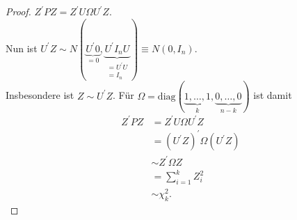 \documentclass{tstextbook}
\begin{document}
\begin{proof}
	$ Z^\prime PZ = Z^\prime U \Omega U^\prime Z $. \\
	Nun ist  $ U^\prime Z \sim N(\underbrace{U^\prime 0}_{=0}, \underbrace{U^\prime I_n U}_{\substack{= U^\prime U \\ = I_n}}) \equiv N(0, I_n) $. \\
	
	Insbesondere ist $ Z \sim U^\prime Z $. Für $ \Omega = \text{diag}(\underbrace{1, \ldots, 1}_k, \underbrace{0, \ldots, 0}_{n-k}) $ ist damit 
	\[
	\begin{aligned}
		Z^\prime P Z & = Z^\prime U \Omega U^\prime Z \\
		& = (U^\prime Z)^\prime \Omega (U^\prime Z) \\
		& \sim Z^\prime \Omega Z \\
		& = \sum_{i=1}^{k} Z_i^2 \\
		& \sim \chi_k^2.
	\end{aligned}
	\]
\end{proof}
\end{document}
